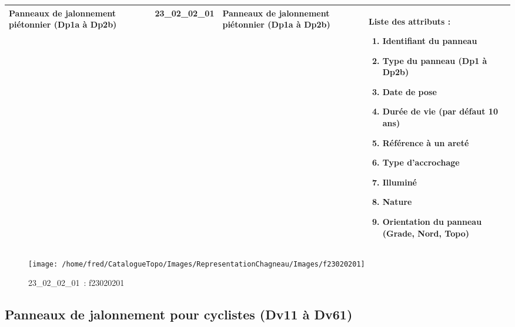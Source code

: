 \documentclass[12pt,titlepage]{book}
\begin{document}
\renewcommand{\arraystretch}{1.2}
\begin{supertabular}{|p{10cm}|c|p{13cm}|p{12cm}|}
 Panneaux de jalonnement piétonnier (Dp1a à Dp2b) & 23\_02\_02\_01 & Panneaux de jalonnement piétonnier (Dp1a à Dp2b) & Liste des attributs :
\begin{enumerate}
  \item Identifiant du panneau  \item Type du panneau (Dp1 à Dp2b)  \item Date de pose  \item Durée de vie (par défaut 10 ans)  \item Référence à un areté  \item Type d'accrochage  \item Illuminé  \item Nature  \item Orientation du panneau (Grade, Nord, Topo)\end{enumerate}
\\
\hline
\end{supertabular}
\begin{figure}[h!]
  \hfill         %
  \begin{minipage}[t]{3cm}
    \begin{center}
      \texttt{[image: /home/fred/CatalogueTopo/Images/RepresentationChagneau/Images/f23020201]}
      \caption[~23\_02\_02\_01]{\small{23\_02\_02\_01~:} \tiny{f23020201}}\label{f23020201}
    \end{center}
  \end{minipage}
\end{figure}


\subsection{Panneaux de jalonnement pour cyclistes (Dv11 à Dv61)}
\noindent
\vspace{\baselineskip}
\end{document}
